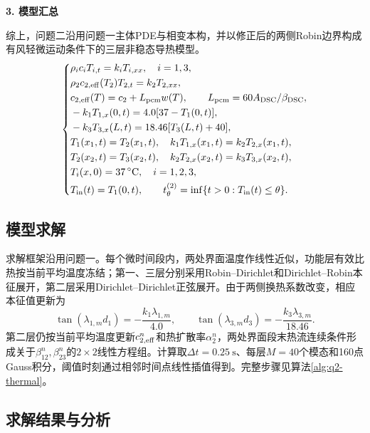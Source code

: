 \noindent\textbf{3. 模型汇总}\par
综上，问题二沿用问题一主体PDE与相变本构，并以修正后的两侧Robin边界构成有风轻微运动条件下的三层非稳态导热模型。
\vspace{-0.3\baselineskip}
\begin{equation}
\left\{
\begin{split}
&\rho_i c_iT_{i,t}=k_iT_{i,xx},\quad i=1,3,\\
&\rho_2 c_{2,\mathrm{eff}}(T_2)T_{2,t}=k_2T_{2,xx},\\
&c_{2,\mathrm{eff}}(T)=c_2+L_{\rm pcm}w(T),\qquad L_{\rm pcm}=60A_{\rm DSC}/\beta_{\rm DSC},\\
&-k_1T_{1,x}(0,t)=4.0[37-T_1(0,t)],\\
&-k_3T_{3,x}(L,t)=18.46[T_3(L,t)+40],\\
&T_1(x_1,t)=T_2(x_1,t),\quad k_1T_{1,x}(x_1,t)=k_2T_{2,x}(x_1,t),\\
&T_2(x_2,t)=T_3(x_2,t),\quad k_2T_{2,x}(x_2,t)=k_3T_{3,x}(x_2,t),\\
&T_i(x,0)=37\,^{\circ}\mathrm C,\quad i=1,2,3,\\
&T_{\rm in}(t)=T_1(0,t),\qquad t_{\theta}^{(2)}=\inf\{t>0:T_{\rm in}(t)\le\theta\}.
\end{split}
\right.
\label{eq:q2-model-summary}
\end{equation}

\subsection{模型求解}

求解框架沿用问题一。每个微时间段内，两处界面温度作线性近似，功能层有效比热按当前平均温度冻结；第一、三层分别采用Robin--Dirichlet和Dirichlet--Robin本征展开，第二层采用Dirichlet--Dirichlet正弦展开。由于两侧换热系数改变，相应本征值更新为
\begin{equation}
\tan(\lambda_{1,m}d_1)=-\frac{k_1\lambda_{1,m}}{4.0},\qquad
\tan(\lambda_{3,m}d_3)=-\frac{k_3\lambda_{3,m}}{18.46}.
\label{eq:q2-eigen}
\end{equation}
第二层仍按当前平均温度更新$c_{2,\rm eff}^n$和热扩散率$\alpha_2^n$，两处界面段末热流连续条件形成关于$\beta_{12}^n,\beta_{23}^n$的$2\times2$线性方程组。计算取$\Delta t=0.25\ \mathrm s$、每层$M=40$个模态和160点Gauss积分，阈值时刻通过相邻时间点线性插值得到。完整步骤见算法\ref{alg:q2-thermal}。



\subsection{求解结果与分析}

